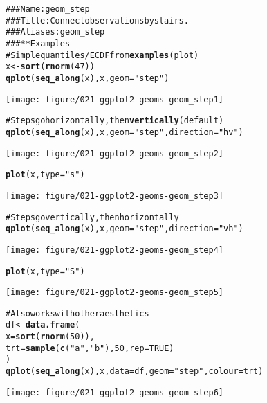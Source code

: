 \documentclass[a4paper,titlepage]{tufte-handout}\usepackage{graphicx, color}
\makeatletter
\def\maxwidth{ %
  \ifdim\Gin@nat@width>\linewidth
    \linewidth
  \else
    \Gin@nat@width
  \fi
}
\newcommand{\hlfunctioncall}[1]{\textcolor[rgb]{0.501960784313725,0,0.329411764705882}{\textbf{#1}}}%
\newcommand{\hlstring}[1]{\textcolor[rgb]{0.6,0.6,1}{#1}}%
\newcommand{\hlcomment}[1]{\textcolor[rgb]{0.180392156862745,0.6,0.341176470588235}{#1}}%
\newenvironment{kframe}{%
 \def\at@end@of@kframe{}%
 \ifinner\ifhmode%
  \def\at@end@of@kframe{\end{minipage}}%
  \begin{minipage}{\columnwidth}%
 \fi\fi%
 \def\FrameCommand##1{\hskip\@totalleftmargin \hskip-\fboxsep
 \colorbox{shadecolor}{##1}\hskip-\fboxsep
     \hskip-\linewidth \hskip-\@totalleftmargin \hskip\columnwidth}%
 \MakeFramed {\advance\hsize-\width
   \@totalleftmargin\z@ \linewidth\hsize
   \@setminipage}}%
 {\par\unskip\endMakeFramed%
 \at@end@of@kframe}
\newenvironment{knitrout}{}{} %
\makeatother
\begin{document}
\begin{knitrout}
\color{fgcolor}\begin{kframe}
\begin{alltt}
\hlcomment{### Name: geom_step}
\hlcomment{### Title: Connect observations by stairs.}
\hlcomment{### Aliases: geom_step}
\hlcomment{### ** Examples}
\hlcomment{# Simple quantiles/ECDF from \hlfunctioncall{examples}(plot)}
x <- \hlfunctioncall{sort}(\hlfunctioncall{rnorm}(47))
\hlfunctioncall{qplot}(\hlfunctioncall{seq_along}(x), x, geom=\hlstring{"step"})
\end{alltt}
\end{kframe}\texttt{[image: figure/021-ggplot2-geoms-geom\_step1]} \begin{kframe}\begin{alltt}
\hlcomment{# Steps go horizontally, then \hlfunctioncall{vertically} (default)}
\hlfunctioncall{qplot}(\hlfunctioncall{seq_along}(x), x, geom=\hlstring{"step"}, direction = \hlstring{"hv"})
\end{alltt}
\end{kframe}\texttt{[image: figure/021-ggplot2-geoms-geom\_step2]} \begin{kframe}\begin{alltt}
\hlfunctioncall{plot}(x, type = \hlstring{"s"})
\end{alltt}
\end{kframe}\texttt{[image: figure/021-ggplot2-geoms-geom\_step3]} \begin{kframe}\begin{alltt}
\hlcomment{# Steps go vertically, then horizontally}
\hlfunctioncall{qplot}(\hlfunctioncall{seq_along}(x), x, geom=\hlstring{"step"}, direction = \hlstring{"vh"})
\end{alltt}
\end{kframe}\texttt{[image: figure/021-ggplot2-geoms-geom\_step4]} \begin{kframe}\begin{alltt}
\hlfunctioncall{plot}(x, type = \hlstring{"S"})
\end{alltt}
\end{kframe}\texttt{[image: figure/021-ggplot2-geoms-geom\_step5]} \begin{kframe}\begin{alltt}
\hlcomment{# Also works with other aesthetics}
df <- \hlfunctioncall{data.frame}(
  x = \hlfunctioncall{sort}(\hlfunctioncall{rnorm}(50)),
  trt = \hlfunctioncall{sample}(\hlfunctioncall{c}(\hlstring{"a"}, \hlstring{"b"}), 50, rep = TRUE)
)
\hlfunctioncall{qplot}(\hlfunctioncall{seq_along}(x), x, data = df, geom=\hlstring{"step"}, colour = trt)
\end{alltt}
\end{kframe}\texttt{[image: figure/021-ggplot2-geoms-geom\_step6]} 
\end{knitrout}
\end{document}
